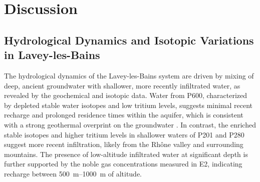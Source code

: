 


\section{Discussion}
\subsection{Hydrological Dynamics and Isotopic Variations in Lavey-les-Bains}
The hydrological dynamics of the Lavey-les-Bains system are driven by mixing of deep, ancient groundwater with shallower, more recently infiltrated water, as revealed by the geochemical and isotopic data.
Water from P600, characterized by depleted stable water isotopes and low tritium levels, suggests minimal recent recharge and prolonged residence times within the aquifer, which is consistent with a strong geothermal overprint on the groundwater \citep{sonney2009numerical, vuataz1982hydrogeologie}.
In contrast, the enriched stable isotopes and higher tritium levels in shallower waters of P201 and P280 suggest more recent infiltration, likely from the Rhône valley and surrounding mountains.
The presence of low-altitude infiltrated water at significant depth is further supported by the noble gas concentrations measured in E2, indicating recharge between \SIrange[range-phrase = { and }]{500}{1000}{\meter} of altitude.

